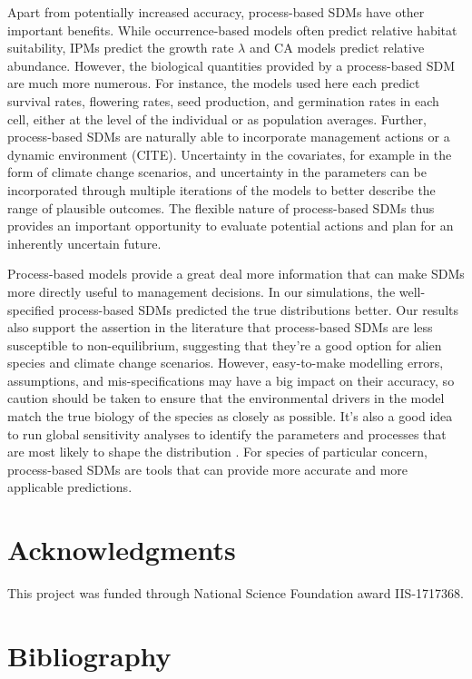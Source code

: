 \documentclass[preprint,review,times,12pt]{elsarticle}
\begin{document}
Apart from potentially increased accuracy, process-based SDMs have other important benefits. While occurrence-based models often predict relative habitat suitability, IPMs predict the growth rate $\lambda$ and CA models predict relative abundance. However, the biological quantities provided by a process-based SDM are much more numerous. For instance, the models used here each predict survival rates, flowering rates, seed production, and germination rates in each cell, either at the level of the individual or as population averages. Further, process-based SDMs are naturally able to incorporate management actions \citep{Szewczyk2019} or a dynamic environment (CITE). Uncertainty in the covariates, for example in the form of climate change scenarios, and uncertainty in the parameters can be incorporated through multiple iterations of the models to better describe the range of plausible outcomes. The flexible nature of process-based SDMs thus provides an important opportunity to evaluate potential actions and plan for an inherently uncertain future.

Process-based models provide a great deal more information that can make SDMs more directly useful to management decisions. In our simulations, the well-specified process-based SDMs predicted the true distributions better. Our results also support the assertion in the literature that process-based SDMs are less susceptible to non-equilibrium, suggesting that they're a good option for alien species and climate change scenarios. However, easy-to-make modelling errors, assumptions, and mis-specifications may have a big impact on their accuracy, so caution should be taken to ensure that the environmental drivers in the model match the true biology of the species as closely as possible. It's also a good idea to run global sensitivity analyses to identify the parameters and processes that are most likely to shape the distribution \citep{Prowse2016,Aiello-Lammens2017}. For species of particular concern, process-based SDMs are tools that can provide more accurate and more applicable predictions.



\section{Acknowledgments}
This project was funded through National Science Foundation award IIS-1717368. 


\section{Bibliography}

\end{document}
